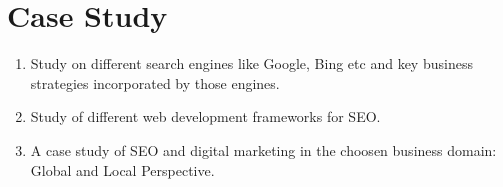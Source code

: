 


\section{Case Study}
\begin{enumerate}
    \item  Study on different search engines like Google, Bing etc and key business strategies incorporated by those engines.
    \item Study of different web development frameworks for SEO.
    \item A case study of SEO and digital marketing in the choosen business domain: Global and Local Perspective.
\end{enumerate}